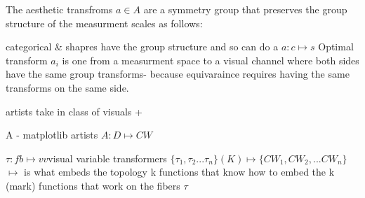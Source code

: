 \documentclass[letterpaper,onecolumn,titlepage]{Ythesis}
\begin{document}
The aesthetic transfroms $a \in A$ are a symmetry group that preserves the group structure of the measurment scales as follows: 

categorical \& shapres have the group structure and so can do a $a: c \mapsto s$
Optimal transform $a_{i}$ is one from a measurment space to a visual channel where both sides have the same group transforms-
because equivaraince requires having the same transforms on the same side. 

artists take in class of visuals + 

A - matplotlib artists 
$A: D \mapsto CW$

$\tau: fb \mapsto vv $visual variable transformers
$\{\tau_{1}, \tau_{2}...\tau_{n}\}(K)\mapsto \{CW_{1}, CW_{2}, ...CW_{n}\}$ 
$\mapsto$ is what embeds the topology k 
functions that know how to embed the k (mark)
functions that work on the fibers $\tau$

\end{document}
